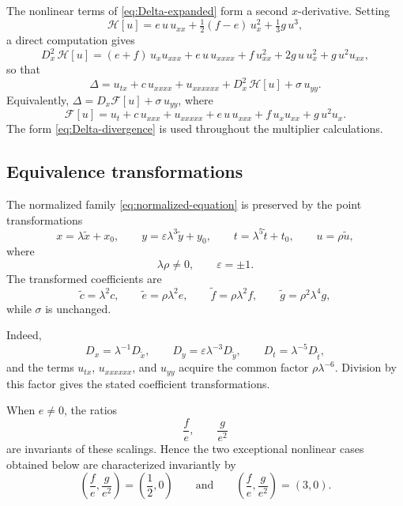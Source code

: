 \documentclass[11pt]{article}
\numberwithin{equation}{section}
\theoremstyle{definition}
\theoremstyle{remark}
\begin{document}
The nonlinear terms of \eqref{eq:Delta-expanded} form a second
$x$-derivative. Setting
\begin{equation}
\mathcal{H}[u]
= e\,u\,u_{xx} + \tfrac{1}{2}(f-e)\,u_x^2 + \tfrac{1}{3}g\,u^3,
\label{eq:H-def}
\end{equation}
a direct computation gives
\begin{equation}
D_x^2\,\mathcal{H}[u]
= (e+f)\,u_x u_{xxx} + e\,u\,u_{xxxx} + f\,u_{xx}^2
+ 2g\,u\,u_x^2 + g\,u^2 u_{xx},
\label{eq:H-second-derivative}
\end{equation}
so that
\begin{equation}
\Delta = u_{tx} + c\,u_{xxxx} + u_{xxxxxx}
+ D_x^2\,\mathcal{H}[u] + \sigma\,u_{yy}.
\label{eq:Delta-divergence}
\end{equation}
Equivalently, $\Delta = D_x\mathcal{F}[u] + \sigma\,u_{yy}$, where
\begin{equation}
\mathcal{F}[u]
= u_t + c\,u_{xxx} + u_{xxxxx}
+ e\,u\,u_{xxx} + f\,u_x u_{xx} + g\,u^2 u_x .
\label{eq:F-def}
\end{equation}
The form \eqref{eq:Delta-divergence} is used throughout the
multiplier calculations.
\subsection{Equivalence transformations}

The normalized family \eqref{eq:normalized-equation} is preserved by
the point transformations
\begin{equation*}
x=\lambda\widetilde{x}+x_0,
\qquad
y=\varepsilon\lambda^3\widetilde{y}+y_0,
\qquad
t=\lambda^5\widetilde{t}+t_0,
\qquad
u=\rho\widetilde{u},
\end{equation*}
where
\[
\lambda\rho\neq0,
\qquad
\varepsilon=\pm1.
\]
The transformed coefficients are
\begin{equation*}
\widetilde{c}=\lambda^2c,
\qquad
\widetilde{e}=\rho\lambda^2e,
\qquad
\widetilde{f}=\rho\lambda^2f,
\qquad
\widetilde{g}=\rho^2\lambda^4g,
\end{equation*}
while $\sigma$ is unchanged.

Indeed,
\[
D_x=\lambda^{-1}D_{\widetilde{x}},
\qquad
D_y=\varepsilon\lambda^{-3}D_{\widetilde{y}},
\qquad
D_t=\lambda^{-5}D_{\widetilde{t}},
\]
and the terms $u_{tx}$, $u_{xxxxxx}$, and $u_{yy}$ acquire the common
factor $\rho\lambda^{-6}$. Division by this factor gives the stated
coefficient transformations.

When $e\neq0$, the ratios
\begin{equation*}
\frac{f}{e},
\qquad
\frac{g}{e^2}
\end{equation*}
are invariants of these scalings. Hence the two exceptional nonlinear
cases obtained below are characterized invariantly by
\begin{equation*}
\left(
\frac{f}{e},\frac{g}{e^2}
\right)
=
\left(\frac12,0\right)
\qquad\text{and}\qquad
\left(
\frac{f}{e},\frac{g}{e^2}
\right)
=
(3,0).
\end{equation*}
\end{document}
